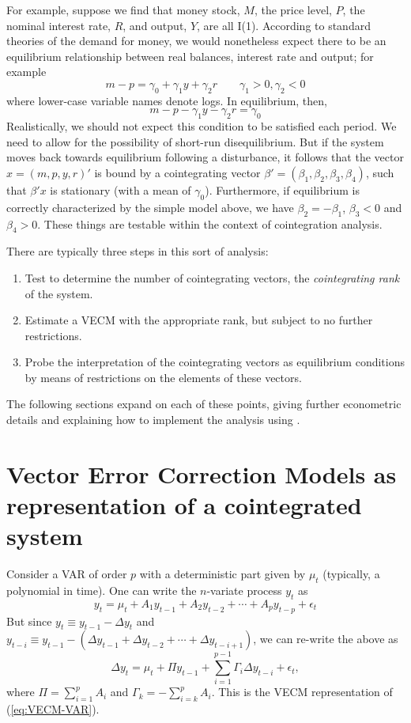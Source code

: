 For example, suppose we find that money stock, $M$, the price level,
$P$, the nominal interest rate, $R$, and output, $Y$, are all I(1).
According to standard theories of the demand for money, we would
nonetheless expect there to be an equilibrium relationship between
real balances, interest rate and output; for example
\[
m - p = \gamma_0 + \gamma_1 y + \gamma_2 r \qquad \gamma_1 > 0,
\gamma_2 < 0
\]
where lower-case variable names denote logs.  In equilibrium, then,
\[
m - p - \gamma_1 y - \gamma_2 r = \gamma_0
\]
Realistically, we should not expect this condition to be satisfied
each period.  We need to allow for the possibility of short-run
disequilibrium.  But if the system moves back towards equilibrium
following a disturbance, it follows that the vector $x = (m, p, y,
r)'$ is bound by a cointegrating vector $\beta' = (\beta_1, \beta_2,
\beta_3, \beta_4)$, such that $\beta'x$ is stationary (with a mean of
$\gamma_0$).  Furthermore, if equilibrium is correctly characterized
by the simple model above, we have $\beta_2 = -\beta_1$, $\beta_3 < 0$
and $\beta_4 > 0$.  These things are testable within the context of
cointegration analysis.

There are typically three steps in this sort of analysis:
\begin{enumerate}
\item Test to determine the number of cointegrating vectors, the 
  \emph{cointegrating rank} of the system.
\item Estimate a VECM with the appropriate rank, but subject to no
  further restrictions.
\item Probe the interpretation of the cointegrating vectors as
  equilibrium conditions by means of restrictions on the elements
  of these vectors.
\end{enumerate}

The following sections expand on each of these points, giving further
econometric details and explaining how to implement the analysis using
.


\section{Vector Error Correction Models as representation of a
  cointegrated system}
\label{sec:VECM-rep}

Consider a VAR of order $p$ with a deterministic part given by $\mu_t$
(typically, a polynomial in time). One can write the $n$-variate
process $y_t$ as
\begin{equation}
  \label{eq:VECM-VAR}
  y_t = \mu_t + A_1 y_{t-1} + A_2 y_{t-2} + \cdots + A_p y_{t-p} +
  \epsilon_t 
\end{equation}
But since $y_t \equiv y_{t-1} - \Delta y_t$ and $y_{t-i} \equiv
y_{t-1} - (\Delta y_{t-1} + \Delta y_{t-2} + \cdots + \Delta
y_{t-i+1})$, we can re-write the above as
\begin{equation}
  \label{eq:VECM}
  \Delta y_t = \mu_t + \Pi y_{t-1} + \sum_{i=1}^{p-1} \Gamma_i \Delta
  y_{t-i} + \epsilon_t ,
\end{equation}
where $\Pi = \sum_{i=1}^p A_i$ and $\Gamma_k = -\sum_{i=k}^p A_i$.
This is the VECM representation of (\ref{eq:VECM-VAR}).

